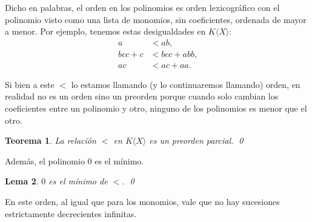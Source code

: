 \documentclass[12pt]{report}
\theoremstyle{customstyle}
\newtheorem{theorem}{Teorema}[chapter]
\newtheorem{lemma}[theorem]{Lema}
\theoremstyle{factstyle}
\begin{document}
Dicho en palabras, el orden en los polinomios es orden lexicográfico con el polinomio visto como una lista de monomios, sin coeficientes, ordenada de mayor a menor. Por ejemplo, tenemos estas desigualdades en $K⟨X⟩$:
\begin{align*}
  a &< ab \text{,} \\
  bcc + c &< bcc + abb \text{,} \\
  ac &< ac + aa \text{.}
\end{align*}

Si bien a este $<$ lo estamos llamando (y lo continuaremos llamando) orden, en realidad no es un orden sino un preorden porque cuando solo cambian los coeficientes entre un polinomio y otro, ninguno de los polinomios es menor que el otro.

\begin{theorem}
  La relación $<$ en $K⟨X⟩$ es un preorden parcial.
  \qed
\end{theorem}

Además, el polinomio $0$ es el mínimo.

\begin{lemma}\label{lemma:0 es mínimo}
  $0$ es el mínimo de $<$.
  \qed
\end{lemma}

En este orden, al igual que para los monomios, vale que no hay sucesiones estrictamente decrecientes infinitas.
\end{document}
